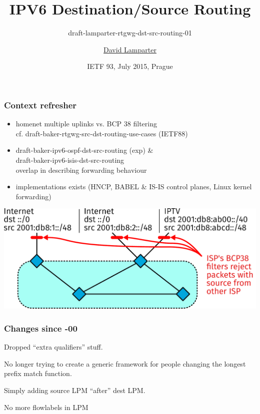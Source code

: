 \documentclass[14pt]{beamer}
\title{IPV6 Destination/Source Routing}
\subtitle{%
  draft-lamparter-rtgwg-dst-src-routing-01%
}
\author{%
  \underline{David Lamparter}%
}
\date{IETF 93, July 2015, Prague}
\begin{document}
\begin{frame}
  \titlepage
\end{frame}

\begin{frame}
  \frametitle{Context refresher}
  \begin{itemize}
  \item homenet multiple uplinks vs. BCP 38 filtering\\%
    cf. draft-baker-rtgwg-src-dst-routing-use-cases (IETF88)
  \item draft-baker-ipv6-ospf-dst-src-routing (exp) \&\\%
    draft-baker-ipv6-isis-dst-src-routing\\%
    overlap in describing forwarding behaviour
  \item implementations exists
    (HNCP, BABEL \& IS-IS control planes, Linux kernel forwarding)
  \end{itemize}
\end{frame}

\begin{frame}
  \includegraphics[scale=0.45,angle=0]{intro_topo_bcp.pdf}%
\end{frame}

\begin{frame}
  \frametitle{Changes since -00}

  Dropped ``extra qualifiers'' stuff.

  \vspace{5mm}

  No longer trying to create a generic framework for people changing the
  longest prefix match function.

  \vspace{3mm}

  Simply adding source LPM ``after'' dest LPM.

  \vspace{5mm}

  {\footnotesize No more flowlabels in LPM}
\end{frame}
\end{document}
